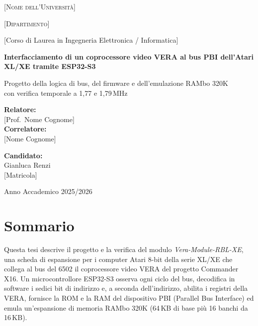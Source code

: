 \documentclass[11pt,a4paper,twoside,openright]{report}
\begin{document}
\begin{titlepage}
  \centering
  {\large \textsc{[Nome dell'Università]}\par}
  \vspace{0.3cm}
  {\textsc{[Dipartimento]}\par}
  \vspace{0.2cm}
  {[Corso di Laurea in Ingegneria Elettronica / Informatica]\par}
  \vspace{2.8cm}
  {\LARGE\bfseries Interfacciamento di un coprocessore video VERA al bus PBI dell'Atari XL/XE tramite ESP32-S3\par}
  \vspace{0.6cm}
  {\large Progetto della logica di bus, del firmware e dell'emulazione RAMbo 320K\\ con verifica temporale a 1,77 e 1,79\,MHz\par}
  \vfill
  \begin{minipage}[t]{0.45\textwidth}
    \raggedright
    \textbf{Relatore:}\\ {[Prof.\ Nome Cognome]}\\[0.4cm]
    \textbf{Correlatore:}\\ {[Nome Cognome]}
  \end{minipage}\hfill
  \begin{minipage}[t]{0.45\textwidth}
    \raggedleft
    \textbf{Candidato:}\\ Gianluca Renzi\\ {[Matricola]}
  \end{minipage}
  \vspace{2.2cm}

  {Anno Accademico 2025/2026\par}
\end{titlepage}

\cleardoublepage
{}

\chapter*{Sommario}

Questa tesi descrive il progetto e la verifica del modulo \emph{Vera-Module-RBL-XE}, una
scheda di espansione per i computer Atari 8-bit della serie XL/XE che collega al bus del
6502 il coprocessore video VERA del progetto Commander X16. Un microcontrollore ESP32-S3
osserva ogni ciclo del bus, decodifica in software i sedici bit di indirizzo e, a seconda
dell'indirizzo, abilita i registri della VERA, fornisce la ROM e la RAM del dispositivo PBI
(Parallel Bus Interface) ed emula un'espansione di memoria RAMbo 320K (64\,KB di base più
16 banchi da 16\,KB).
\end{document}
